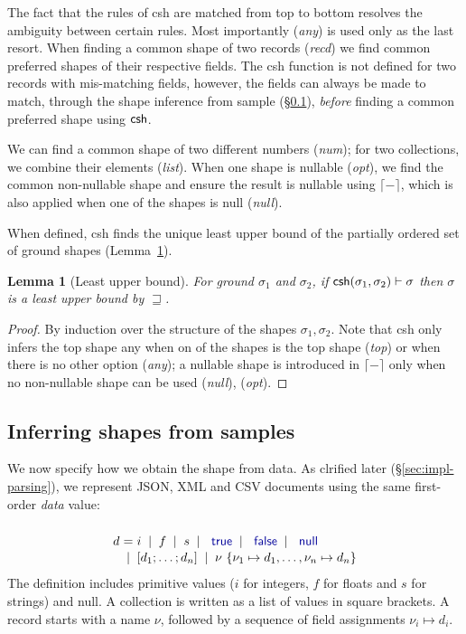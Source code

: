 \documentclass[10pt]{sigplanconf}
\newcommand{\kvd}[1]{\textnormal{\textcolor{kvdclr}{\sffamily #1}}}
\newcommand{\ident}[1]{\textnormal{\sffamily #1}}
\newcommand{\lsep}[0]{\;\; | \;\;}
\newcommand{\narrow}[1]{\hspace{-0.7em} #1 \hspace{-0.7em}}
\newcommand{\addopt}[1]{\lceil#1\rceil}
\newtheorem{lemma}[theorem]{Lemma}
\begin{document}
\noindent
The fact that the rules of \ident{csh} are matched from top to bottom resolves the ambiguity 
between certain rules. Most importantly (\emph{any}) is used only as the last resort.
When finding a common shape of two records (\emph{recd}) we find common preferred shapes of their 
respective fields. The \ident{csh} function is not defined for two records with mis-matching 
fields, however, the fields can always be made to match, through the shape inference 
from sample (\S\ref{sec:formal-inferval}), \emph{before} finding a common preferred shape 
using $\ident{csh}$.

We can find a common shape of two different numbers (\emph{num}); for two collections,
we combine their elements (\emph{list}). When one shape is nullable (\emph{opt}), we find
the common non-nullable shape and ensure the result is nullable using $\addopt{-}$, which
is also applied when one of the shapes is \kvd{null} (\emph{null}). 

When defined, \ident{csh} finds the unique least upper bound of the partially ordered 
set of ground shapes (Lemma~\ref{thm:lub}). 

\begin{lemma}[Least upper bound]
\label{thm:lub}
For ground $\sigma_1$ and $\sigma_2$, if $\ident{csh}(\sigma_1, \sigma_2) \vdash \sigma$ then $\sigma$ is a least upper bound by $\sqsupseteq$.
\end{lemma}
\begin{proof}
By induction over the structure of the shapes $\sigma_1,\sigma_2$. Note that \ident{csh} only infers the top shape 
\kvd{any} when on of the shapes is the top shape (\emph{top}) or when there is no other option 
(\emph{any}); a nullable shape is introduced in $\addopt{-}$ only when no non-nullable shape can
be used (\emph{null}), (\emph{opt}).
\end{proof}

\subsection{Inferring shapes from samples}
\label{sec:formal-inferval}

We now specify how we obtain the shape from data. As clrified later (\S\ref{sec:impl-parsing}), 
we represent JSON, XML and CSV documents using the same first-order \emph{data} value:

\noindent
\begin{equation*}
\begin{array}{lcl}
  \\[-0.5em]
 d &\narrow{=}& i \lsep f \lsep s \lsep \kvd{true} \lsep \kvd{false} \lsep \kvd{null} \\[0.1em]
   &\narrow{|}& [d_1; \ldots; d_n] \lsep \nu~\{ \nu_1 \mapsto d_1, \ldots, \nu_n \mapsto d_n \}
\end{array}
\end{equation*}
%
The definition includes primitive values ($i$ for integers, $f$ for floats
and $s$ for strings) and \kvd{null}. A collection is written as a 
list of values in square brackets. A record starts with a name $\nu$, followed by a 
sequence of field assignments $\nu_i \mapsto d_i$.
\end{document}
